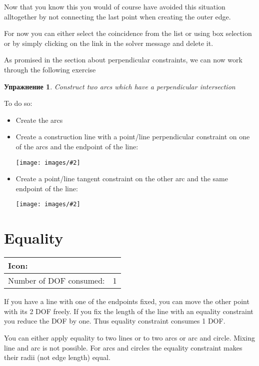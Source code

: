 \documentclass[12pt,titlepage]{article}
\newcommand{\icon}[1]{\raisebox{-1em}{\rule{0pt}{27pt}\texttt{[image: images/\#1]}}}
\newcommand{\img}[2]{\vspace{2ex}\noindent\texttt{[image: images/\#2]}}
\newcommand{\dofConsumed}{Number of DOF consumed:}
\newtheorem{Exercise}{Упражнение}
\begin{document}
Now that you know this you would of course have avoided this situation
alltogether by not connecting the last point when creating the outer edge.

For now you can either select the coincidence from the list or using box selection or
by simply clicking on the link in the solver message and delete it.

As promised in the section about perpendicular constraints, we can now
work through the following exercise

\begin{Exercise}
\label{ExercisePerpendicularArcs}
Construct two arcs which have a perpendicular intersection
\end{Exercise}

To do so:
\begin{itemize}
\item Create the arcs
\item Create a construction line with a point/line perpendicular
      constraint on one of the arcs and the endpoint of the line:

      \img{}{PerpendicularCurveCurve1}
\item Create a point/line tangent constraint on the other arc and the
      same endpoint of the line:

      \img{}{PerpendicularCurveCurve2}
\end{itemize}

\section{Equality}
\begin{tabular}{|l|l|}
\hline
Icon: & \icon{Constraint_EqualLength}\\
\hline
\dofConsumed & 1 \\
\hline
\end{tabular}

If you have a line with one of the endpoints fixed, you can move the other point
with its 2 DOF freely. If you fix the length of the line with an equality constraint
you reduce the DOF by one. Thus equality constraint consumes 1 DOF.

You can either apply equality to two lines or to two arcs or arc and circle.
Mixing line and arc is not possible. For arcs and circles the equality
constraint makes their radii (not edge length) equal.
\end{document}
